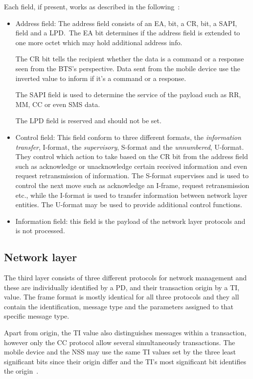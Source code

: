 Each field, if present, works as described in the
following~\cite{layer2}:
\begin{itemize}
\item {Address field}: The address field consists of an \gls{EA}, bit,
  a \gls{CR}, bit, a \gls{SAPI}, field and a \gls{LPD}.\ The \gls{EA}
  bit determines if the address field is extended to one more octet
  which may hold additional address info.

  The \gls{CR} bit tells the recipient whether the data is a command
  or a response seen from the \gls{BTS}'s perspective. Data sent from
  the mobile device use the inverted value to inform if it's a command
  or a response.

  The \gls{SAPI} field is used to determine the service of the payload
  such as \gls{RR}, \gls{MM}, \gls{CC} or even \gls{SMS} data.

  The \gls{LPD} field is reserved and should not be set.

\item {Control field}: This field conform to three different formats,
  the \textit{information transfer}, I-format, the
  \textit{supervisory}, S-format and the \textit{unnumbered},
  U-format. They control which action to take based on the \gls{CR}
  bit from the address field such as acknowledge or unacknowledge
  certain received information and even request retransmission of
  information. The S-format supervises and is used to control the next
  move such as acknowledge an I-frame, request retransmission etc.,
  while the I-format is used to transfer information between network
  layer entities. The U-format may be used to provide additional
  control functions.

\item {Information field}: this field is the payload of the network
  layer protocols and is not processed.
\end{itemize}
\subsection{Network layer}
\label{sec:network_layer}
The third layer consists of three different protocols for network
management and these are individually identified by a \gls{PD}, and
their transaction origin by a \gls{TI}, value. The frame format is
mostly identical for all three protocols and they all contain the
identification, message type and the parameters assigned to that
specific message type.

Apart from origin, the \gls{TI} value also distinguishes messages
within a transaction, however only the \gls{CC} protocol allow several
simultaneously transactions. The mobile device and the \gls{NSS} may
use the same \gls{TI} values set by the three least significant bits
since their origin differ and the \gls{TI}'s most significant bit
identifies the origin~\cite[p. 87]{layer3}.
